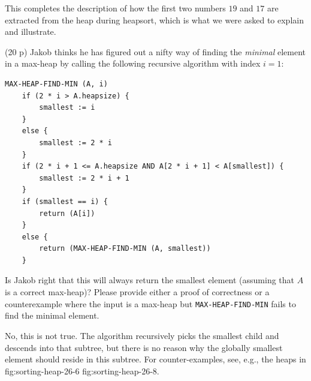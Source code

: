 \documentclass{jn-pset}
\begin{document}
\begin{problem}
\begin{solution}
\begin{enumerate}
  \end{enumerate}
%
  This completes the description of how the first two numbers $19$ and
  $17$ are extracted from the heap during heapsort, which is what we
  were asked to explain and illustrate.
\end{solution}


\begin{subproblem}
  {(20 p)}
  {\ignorespaces}
  Jakob thinks he has figured out a nifty way
  of finding the \emph{minimal} element in a max-heap by calling the
  following recursive algorithm with index $i = 1$:
\begin{verbatim}
MAX-HEAP-FIND-MIN (A, i)
    if (2 * i > A.heapsize) {
        smallest := i
    }
    else {
        smallest := 2 * i
    }
    if (2 * i + 1 <= A.heapsize AND A[2 * i + 1] < A[smallest]) {
        smallest := 2 * i + 1
    }
    if (smallest == i) {
        return (A[i])
    }
    else {
        return (MAX-HEAP-FIND-MIN (A, smallest))
    }
\end{verbatim}
%
  Is Jakob right that this will always return the smallest element
  (assuming that $A$ is a correct max-heap)?
  Please provide either a proof of correctness or a counterexample
  where the input is a max-heap but
  \verb+MAX-HEAP-FIND-MIN+
  fails to find the
  minimal element. 
\end{subproblem}

\begin{solution}
  No, this is not true.
  The algorithm recursively picks the smallest child and descends into
  that subtree, but there is no reason why the globally smallest
  element should reside in this subtree. For counter-examples, see,
  e.g., the heaps in  
  {fig:sorting-heap-26-6}
  {fig:sorting-heap-26-8}.  
\end{solution}


\end{problem}



\end{document}
